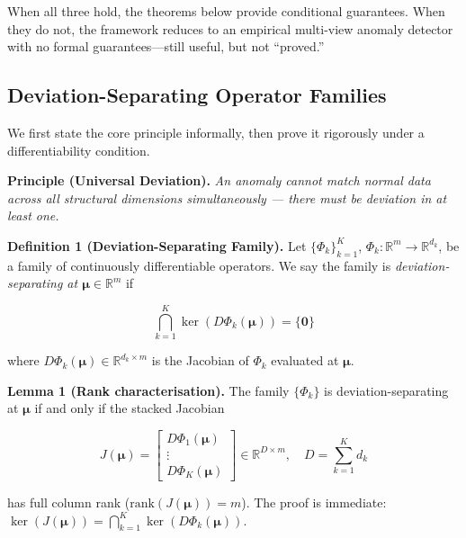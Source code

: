 \documentclass[journal]{IEEEtran}
\newcommand{\R}{\mathbb{R}}
\begin{document}
When all three hold, the theorems below provide conditional guarantees. When they do not, the framework reduces to an empirical multi-view anomaly detector with no formal guarantees---still useful, but not ``proved.''

\subsection{Deviation-Separating Operator Families}
\label{ssec:axiom}

We first state the core principle informally, then prove it rigorously under a differentiability condition.

\textbf{Principle (Universal Deviation).} \textit{An anomaly cannot match normal data across all structural dimensions simultaneously --- there must be deviation in at least one.}

\vspace{0.5em}

\textbf{Definition 1 (Deviation-Separating Family).} Let $\{\Phi_k\}_{k=1}^K$, $\Phi_k: \R^m \to \R^{d_k}$, be a family of continuously differentiable operators. We say the family is \textit{deviation-separating at $\boldsymbol{\mu} \in \R^m$} if

\begin{equation}
\bigcap_{k=1}^{K} \ker\!\left(D\Phi_k(\boldsymbol{\mu})\right) = \{\mathbf{0}\}
\label{eq:separating}
\end{equation}

where $D\Phi_k(\boldsymbol{\mu}) \in \R^{d_k \times m}$ is the Jacobian of $\Phi_k$ evaluated at $\boldsymbol{\mu}$.

\vspace{0.5em}

\textbf{Lemma 1 (Rank characterisation).} The family $\{\Phi_k\}$ is deviation-separating at $\boldsymbol{\mu}$ if and only if the stacked Jacobian

\begin{equation}
J(\boldsymbol{\mu}) = \begin{bmatrix} D\Phi_1(\boldsymbol{\mu}) \\ \vdots \\ D\Phi_K(\boldsymbol{\mu}) \end{bmatrix} \in \R^{D \times m}, \quad D = \textstyle\sum_{k=1}^K d_k
\label{eq:stacked_jacobian}
\end{equation}

has full column rank ($\text{rank}(J(\boldsymbol{\mu})) = m$). The proof is immediate: $\ker(J(\boldsymbol{\mu})) = \bigcap_{k=1}^K \ker(D\Phi_k(\boldsymbol{\mu}))$.
\end{document}
